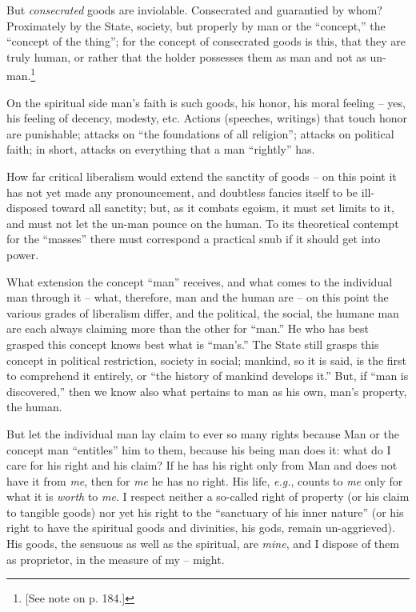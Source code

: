 \documentclass[12pt,a4paper]{book}
\begin{document}
But \textit{consecrated} goods are inviolable. Consecrated and guarantied by 
whom? Proximately by the State, society, but properly by man or the 
``concept,'' the ``concept of the thing''; for the concept of consecrated 
goods is this, that they are truly human, or rather that the holder possesses 
them as man and not as un-man.\footnote{[See note on p. 184.]}

On the spiritual side man's faith is such goods, his honor, his moral feeling 
-- yes, his feeling of decency, modesty, etc. Actions (speeches, writings) 
that touch honor are punishable; attacks on ``the foundations of all 
religion''; attacks on political faith; in short, attacks on everything that 
a man ``rightly'' has.

How far critical liberalism would extend the sanctity of goods -- on this 
point it has not yet made any pronouncement, and doubtless fancies itself to 
be ill-disposed toward all sanctity; but, as it combats egoism, it must set 
limits to it, and must not let the un-man pounce on the human. To its 
theoretical contempt for the ``masses'' there must correspond a practical 
snub if it should get into power.

What extension the concept ``man'' receives, and what comes to the 
individual man through it -- what, therefore, man and the human are -- on this 
point the various grades of liberalism differ, and the political, the social, 
the humane man are each always claiming more than the other for ``man.'' He 
who has best grasped this concept knows best what is ``man's.'' The State 
still grasps this concept in political restriction, society in social; 
mankind, so it is said, is the first to comprehend it entirely, or ``the 
history of mankind develops it.'' But, if ``man is discovered,'' then we 
know also what pertains to man as his own, man's property, the human.

But let the individual man lay claim to ever so many rights because Man or the 
concept man ``entitles'' him to them, because his being man does it: what do 
I care for his right and his claim? If he has his right only from Man and does 
not have it from \textit{me}, then for \textit{me} he has no right. His life, 
\textit{e.g.}, counts to \textit{me} only for what it is \textit{worth} to 
\textit{me}. I respect neither a so-called right of property (or his claim to 
tangible goods) nor yet his right to the ``sanctuary of his inner nature'' 
(or his right to have the spiritual goods and divinities, his gods, remain 
un-aggrieved). His goods, the sensuous as well as the spiritual, are 
\textit{mine}, and I dispose of them as proprietor, in the measure of my -- 
might.
\end{document}
